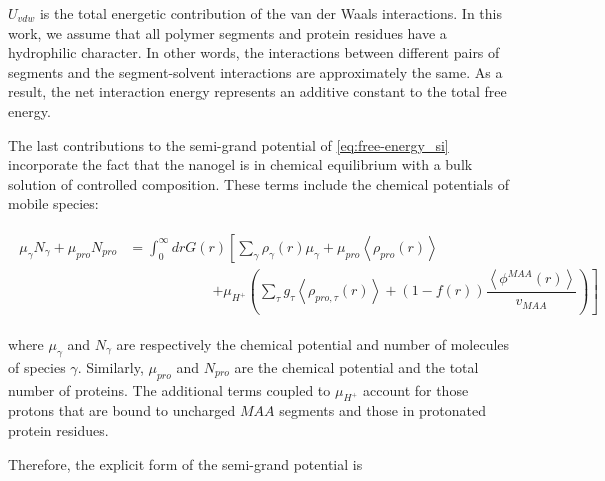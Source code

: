 \documentclass[journal=jacsat,manuscript=suppinfo]{achemso}
\begin{document}



$U_{vdw}$ is the total energetic contribution of the van der Waals interactions.
In this work, we assume that all polymer segments and protein residues have a hydrophilic character.
In other words, the interactions between different pairs of segments and the segment-solvent interactions are approximately the same.
As a result, the net interaction energy represents an additive constant to the total free energy.



The last contributions to the semi-grand potential of \cref{eq:free-energy_si} incorporate the fact that the nanogel is in chemical equilibrium with a bulk solution of controlled composition.
These terms include the chemical potentials of mobile species:



\begin{align}
	\begin{aligned}
		\mu_\gamma N_\gamma + \mu_{pro} N_{pro} &=\int_0^\infty drG(r)\left[\sum_{\gamma }{\rho_\gamma(r)\mu_\gamma}
		+ \mu_{pro} \left<\rho_{pro}(r)\right> \right. \\
		& \hspace{6em}\left. +\mu_{H^+}\left(\sum_{\tau}{g_\tau\left<\rho_{pro,\tau}(r)\right> } +(1-f(r))\dfrac{\left<\phi^{MAA}(r)\right>}{v_{MAA}}\right)\right]
	\end{aligned}
\end{align}

\noindent where  $\mu_\gamma$ and $N_\gamma$ are respectively the chemical potential and  number of molecules of species $\gamma$.
Similarly, $\mu_{pro}$ and $N_{pro}$ are the chemical potential and the total number of proteins.
The additional terms coupled to $\mu_{H^+}$
account for those protons that are bound to uncharged $MAA$ segments and those in protonated protein residues.




Therefore, the explicit form of the semi-grand potential is
\end{document}
